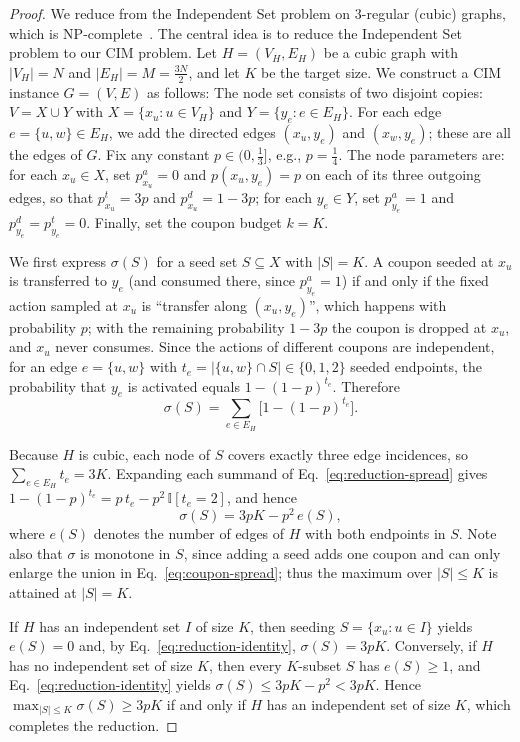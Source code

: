\documentclass[sigconf]{acmart}
\begin{document}
\begin{proof}
We reduce from the Independent Set problem on $3$-regular (cubic)
graphs, which is NP-complete~\cite{garey1979computers,garey1976some}. The central idea is to reduce the Independent Set problem to our CIM problem.
Let $H=(V_H,E_H)$ be a cubic graph with $|V_H|=N$ and
$|E_H|=M=\tfrac{3N}{2}$, and let $K$ be the target size.
We construct a CIM instance $G=(V,E)$ as follows:
The node set consists of two disjoint copies:
$V=X\cup Y$ with $X=\{x_u: u\in V_H\}$ and
$Y=\{y_e: e\in E_H\}$.
For each edge $e=\{u,w\}\in E_H$, we add the directed edges
$(x_u,y_e)$ and $(x_w,y_e)$; these are all the edges of $G$.
Fix any constant $p\in(0,\tfrac13]$, e.g., $p=\tfrac14$.
The node parameters are:
for each $x_u\in X$, set $p_{x_u}^a=0$ and $p(x_u,y_e)=p$ on each of
its three outgoing edges, so that $p_{x_u}^t=3p$ and
$p_{x_u}^d=1-3p$;
for each $y_e\in Y$, set $p_{y_e}^a=1$ and $p_{y_e}^d=p_{y_e}^t=0$.
Finally, set the coupon budget $k=K$.

We first express $\sigma(S)$ for a seed set $S\subseteq X$ with
$|S|=K$.
A coupon seeded at $x_u$ is transferred to $y_e$ (and consumed there,
since $p_{y_e}^a=1$) if and only if the fixed action sampled at $x_u$
is ``transfer along $(x_u,y_e)$'', which happens with probability
$p$; with the remaining probability $1-3p$ the coupon is dropped at
$x_u$, and $x_u$ never consumes.
Since the actions of different coupons are independent, for an edge
$e=\{u,w\}$ with $t_e=|\{u,w\}\cap S|\in\{0,1,2\}$ seeded endpoints,
the probability that $y_e$ is activated equals
$1-(1-p)^{t_e}$.
Therefore
\begin{equation}
\label{eq:reduction-spread}
\sigma(S)
=\sum_{e\in E_H}\bigl[1-(1-p)^{t_e}\bigr].
\end{equation}

Because $H$ is cubic, each node of $S$ covers exactly three edge
incidences, so $\sum_{e\in E_H} t_e = 3K$.
Expanding each summand of Eq.~\eqref{eq:reduction-spread} gives
$1-(1-p)^{t_e}=p\,t_e-p^2\,\mathbb{I}[t_e=2]$, and hence
\begin{equation}
\label{eq:reduction-identity}
\sigma(S)=3pK-p^2\,e(S),
\end{equation}
where $e(S)$ denotes the number of edges of $H$ with both endpoints
in $S$.
Note also that $\sigma$ is monotone in $S$, since adding a seed adds
one coupon and can only enlarge the union in
Eq.~\eqref{eq:coupon-spread}; thus the maximum over $|S|\le K$ is
attained at $|S|=K$.

If $H$ has an independent set $I$ of size $K$, then seeding
$S=\{x_u:u\in I\}$ yields $e(S)=0$ and, by
Eq.~\eqref{eq:reduction-identity}, $\sigma(S)=3pK$.
Conversely, if $H$ has no independent set of size $K$, then every
$K$-subset $S$ has $e(S)\ge 1$, and
Eq.~\eqref{eq:reduction-identity} yields
$\sigma(S)\le 3pK-p^2<3pK$.
Hence $\max_{|S|\le K}\sigma(S)\ge 3pK$ if and only if $H$ has an
independent set of size $K$, which completes the reduction.
\end{proof}
\end{document}
